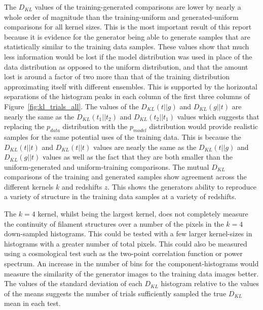 \documentclass[twocolumn]{article}
\numberwithin{equation}{section}
\begin{document}

The $D_{KL}$ values of the training-generated comparisons are lower by nearly a whole order of magnitude than the 
training-uniform and generated-uniform comparisons for all kernel sizes. This is the most important result of this report 
because it is evidence for the generator being able to generate samples that are statistically similar to the training data
samples. These values show that much less information would be lost if the model distribution was used in place of the data 
distribution as opposed to the uniform distribution, and that the amount lost is around a factor of two more than that of the 
training distribution approximating itself with different ensembles. This is supported by the horizontal separations of the 
histogram peaks in each column of the first three columns of Figure~\ref{fig:kl_trials_all}. The values of the $D_{KL}(t||g)$ 
and $D_{KL}(g||t)$ are nearly the same as the $D_{KL}(t_1||t_2)$ and $D_{KL}(t_2||t_1)$ values which suggests that replacing 
the $p_{data}$ distribution with the $p_{model}$ distribution would provide realistic samples for the same potential uses 
of the training data. This is because the $D_{KL}(t||t)$ and $D_{KL}(t||t)$ values are nearly the same as the $D_{KL}(t||g)$
and $D_{KL}(g||t)$ values as well as the fact that they are both smaller than the uniform-generated and uniform-training 
comparisons. %
The mutual $D_{KL}$ comparisons of the training and generated samples show agreement across the different kernels $k$ and
redshifts $z$. This shows the generators ability to reproduce a variety of structure in the training data samples at a variety 
of redshifts. 

The $k=4$ kernel, whilst being the largest kernel, does not completely measure the continuity of filament structures over 
a number of the pixels in the $k=4$ down-sampled histograms. This could be tested with a few larger kernel-sizes in histograms 
with a greater number of total pixels. This could also be measured using a cosmological test such as the two-point correlation 
function or power spectrum. An increase in the number of bins for the component-histograms would measure the similarity of
the generator images to the training data images better. The values of the standard deviation of each $D_{KL}$ histogram 
relative to the values of the means suggests the number of trials sufficiently sampled the true $D_{KL}$ mean in each test.
\end{document}
